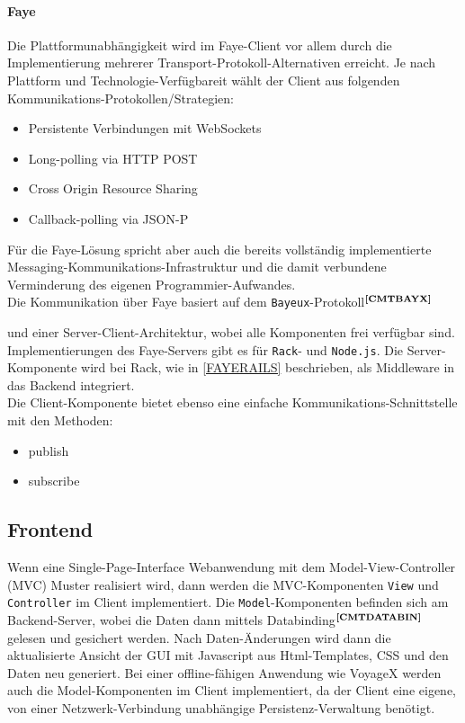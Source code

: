 \paragraph{Faye}
Die Plattformunabhängigkeit wird im Faye-Client vor allem durch die Implementierung mehrerer Transport-Protokoll-Alternativen erreicht. Je nach Plattform und Technologie-Verfügbareit wählt der Client aus folgenden Kommunikations-Protokollen/Strategien:
	\begin{itemize}
		\item Persistente Verbindungen mit WebSockets
		\item Long-polling via HTTP POST
		\item Cross Origin Resource Sharing
		\item Callback-polling via JSON-P
	\end{itemize}
Für die Faye-Lösung spricht aber auch die bereits vollständig implementierte Messaging-Kommunikations-Infrastruktur und die damit verbundene Verminderung des eigenen Programmier-Aufwandes.\\
Die Kommunikation über Faye basiert auf dem \texttt{Bayeux}-Protokoll$^{\textbf{\ref{CMTBAYX}}}$%
\addtocounter{footnote}{1}%
 und einer Server-Client-Architektur, wobei alle
Komponenten frei verfügbar sind.
Implementierungen des Faye-Servers gibt es für \texttt{Rack}- und \texttt{Node.js}.
Die Server-Komponente wird bei Rack, wie in \ref{FAYERAILS} beschrieben, als Middleware in das Backend integriert.\\
Die Client-Komponente bietet ebenso eine einfache Kommunikations-Schnittstelle mit den Methoden:
\begin{itemize}[leftmargin=*,noitemsep,topsep=1ex,parsep=0pt,partopsep=0pt]
\item publish
\item subscribe
\end{itemize}


\subsection{Frontend}\label{5_FE}
Wenn eine Single-Page-Interface Webanwendung mit dem Model-View-Controller (MVC) Muster realisiert wird, dann werden die MVC-Komponenten \texttt{View} und \texttt{Controller} im Client implementiert. Die \texttt{Model}-Komponenten befinden sich am Backend-Server, wobei die Daten dann mittels Databinding$^{\textbf{\ref{CMTDATABIN}}}$ gelesen und gesichert werden. Nach Daten-Änderungen wird dann die aktualisierte Ansicht der GUI mit Javascript aus Html-Templates, CSS und den Daten neu generiert. Bei einer offline-fähigen Anwendung wie VoyageX werden auch die Model-Komponenten im Client implementiert, da der Client eine eigene, von einer Netzwerk-Verbindung unabhängige Persistenz-Verwaltung benötigt.

